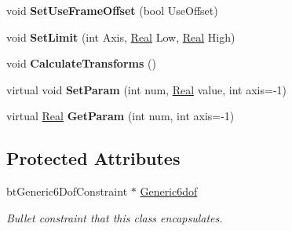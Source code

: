 \begin{DoxyCompactItemize}
\item 
\hypertarget{classphys_1_1Generic6DofConstraint_a579b6fab2dc4897cf984c7f1a0b67210}{
void {\bfseries SetUseFrameOffset} (bool UseOffset)}
\label{de/d2a/classphys_1_1Generic6DofConstraint_a579b6fab2dc4897cf984c7f1a0b67210}

\item 
\hypertarget{classphys_1_1Generic6DofConstraint_afbf5173d41f31dda693c3591b72adf1c}{
void {\bfseries SetLimit} (int Axis, \hyperlink{namespacephys_af7eb897198d265b8e868f45240230d5f}{Real} Low, \hyperlink{namespacephys_af7eb897198d265b8e868f45240230d5f}{Real} High)}
\label{de/d2a/classphys_1_1Generic6DofConstraint_afbf5173d41f31dda693c3591b72adf1c}

\item 
\hypertarget{classphys_1_1Generic6DofConstraint_ab954137222c74dbe2d4410738b3f6883}{
void {\bfseries CalculateTransforms} ()}
\label{de/d2a/classphys_1_1Generic6DofConstraint_ab954137222c74dbe2d4410738b3f6883}

\item 
\hypertarget{classphys_1_1Generic6DofConstraint_a644245f0533a2fe1586609fcf1f48171}{
virtual void {\bfseries SetParam} (int num, \hyperlink{namespacephys_af7eb897198d265b8e868f45240230d5f}{Real} value, int axis=-\/1)}
\label{de/d2a/classphys_1_1Generic6DofConstraint_a644245f0533a2fe1586609fcf1f48171}

\item 
\hypertarget{classphys_1_1Generic6DofConstraint_a822152201f9bd6d0a3e1512fa25b3f49}{
virtual \hyperlink{namespacephys_af7eb897198d265b8e868f45240230d5f}{Real} {\bfseries GetParam} (int num, int axis=-\/1)}
\label{de/d2a/classphys_1_1Generic6DofConstraint_a822152201f9bd6d0a3e1512fa25b3f49}

\end{DoxyCompactItemize}
\subsection*{Protected Attributes}
\begin{DoxyCompactItemize}
\item 
\hypertarget{classphys_1_1Generic6DofConstraint_af323a51e2e4438fc86af1f10a84cc1ba}{
btGeneric6DofConstraint $\ast$ \hyperlink{classphys_1_1Generic6DofConstraint_af323a51e2e4438fc86af1f10a84cc1ba}{Generic6dof}}
\label{de/d2a/classphys_1_1Generic6DofConstraint_af323a51e2e4438fc86af1f10a84cc1ba}

\begin{DoxyCompactList}\small\item\em Bullet constraint that this class encapsulates. \item\end{DoxyCompactList}\end{DoxyCompactItemize}


